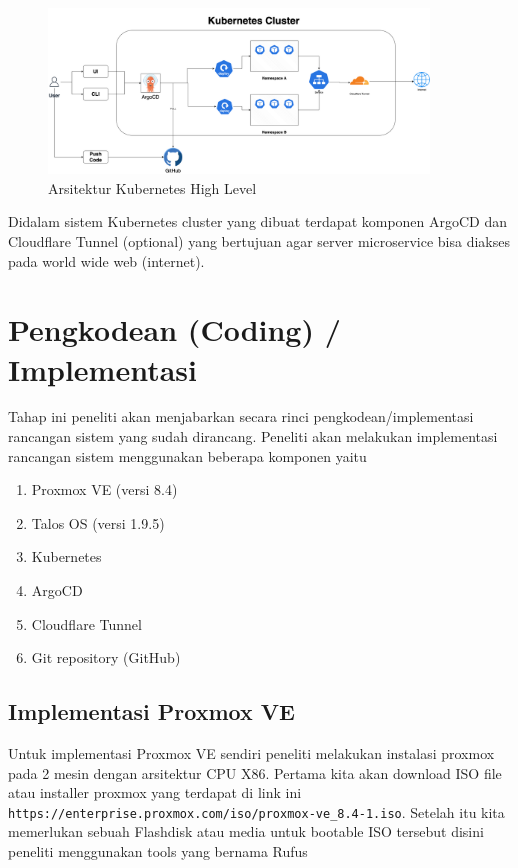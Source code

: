 \begin{figure}[H]
    \centering
    \includegraphics[width=0.9\textwidth]{figures/kube-new.png}
    \caption{Arsitektur Kubernetes High Level}
    \label{fig:arsitektur_kubernetes}
\end{figure}

Didalam sistem Kubernetes cluster yang dibuat terdapat komponen ArgoCD dan Cloudflare Tunnel (optional) yang bertujuan agar server
microservice bisa diakses pada world wide web (internet).

\section{Pengkodean (Coding) / Implementasi}
Tahap ini peneliti akan menjabarkan secara rinci pengkodean/implementasi rancangan sistem yang sudah dirancang.
Peneliti akan melakukan implementasi rancangan sistem menggunakan beberapa komponen yaitu
\begin{enumerate}
    \item Proxmox VE (versi 8.4)
    \item Talos OS (versi 1.9.5)
    \item Kubernetes
    \item ArgoCD
    \item Cloudflare Tunnel
    \item Git repository (GitHub)
\end{enumerate}

\subsection{Implementasi Proxmox VE}
Untuk implementasi Proxmox VE sendiri peneliti melakukan instalasi proxmox pada 2 mesin dengan arsitektur CPU X86.
Pertama kita akan download ISO file atau installer proxmox yang terdapat di link ini \verb|https://enterprise.proxmox.com/iso/proxmox-ve_8.4-1.iso|.
Setelah itu kita memerlukan sebuah Flashdisk atau media untuk bootable ISO tersebut disini peneliti menggunakan tools yang bernama Rufus

